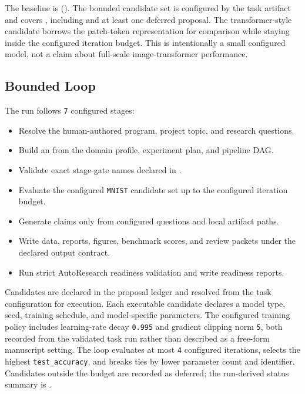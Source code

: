 \documentclass[
]{article}
\providecommand{\tightlist}{%
  \setlength{\itemsep}{0pt}\setlength{\parskip}{0pt}}
\begin{document}
The baseline is 
(). The bounded candidate set is configured by
the task artifact and covers
,
including  and at least one
deferred proposal. The transformer-style candidate borrows the
patch-token representation for comparison while staying inside the
configured iteration budget. This is intentionally a small configured
model, not a claim about full-scale image-transformer performance.

\subsection{Bounded Loop}\label{sec:bounded-loop}

The run follows \texttt{7} configured stages:

\begin{itemize}
\tightlist
\item
  Resolve the human-authored program, project topic, and research
  questions.
\item
  Build an  from the domain profile, experiment
  plan, and pipeline DAG.
\item
  Validate exact stage-gate names declared in
  .
\item
  Evaluate the configured \texttt{MNIST} candidate set up to the
  configured iteration budget.
\item
  Generate claims only from configured questions and local artifact
  paths.
\item
  Write data, reports, figures, benchmark scores, and review packets
  under the declared output contract.
\item
  Run strict AutoResearch readiness validation and write readiness
  reports.
\end{itemize}

Candidates are declared in the proposal ledger and resolved from the
task configuration for execution. Each executable candidate declares a
model type, seed, training schedule, and model-specific parameters. The
configured training policy includes learning-rate decay \texttt{0.995}
and gradient clipping norm \texttt{5}, both recorded from the validated
task run rather than described as a free-form manuscript setting. The
loop evaluates at most \texttt{4} configured iterations, selects the
highest \texttt{test\_accuracy}, and breaks ties by lower parameter
count and identifier. Candidates outside the budget are recorded as
deferred; the run-derived status summary is
.
\end{document}
